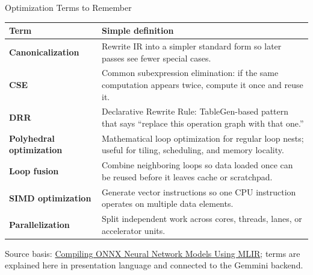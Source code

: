 \documentclass[aspectratio=169,10pt]{beamer}
\newcommand{\edgeword}[1]{\textcolor{red!75!black}{\textbf{#1}}}
\begin{document}
\begin{frame}{Optimization Terms to Remember}
  \scriptsize
  \begin{tabularx}{\textwidth}{@{}lX@{}}
    \toprule
    Term & Simple definition \\
    \midrule
    \edgeword{Canonicalization} & Rewrite IR into a simpler standard form so later passes see fewer special cases. \\
    \edgeword{CSE} & Common subexpression elimination: if the same computation appears twice, compute it once and reuse it. \\
    \edgeword{DRR} & Declarative Rewrite Rule: TableGen-based pattern that says ``replace this operation graph with that one.'' \\
    \edgeword{Polyhedral optimization} & Mathematical loop optimization for regular loop nests; useful for tiling, scheduling, and memory locality. \\
    \edgeword{Loop fusion} & Combine neighboring loops so data loaded once can be reused before it leaves cache or scratchpad. \\
    \edgeword{SIMD optimization} & Generate vector instructions so one CPU instruction operates on multiple data elements. \\
    \edgeword{Parallelization} & Split independent work across cores, threads, lanes, or accelerator units. \\
    \bottomrule
  \end{tabularx}

  \vspace{0.45em}
  {\tiny Source basis: \href{https://arxiv.org/abs/2008.08272}{Compiling ONNX Neural Network Models Using MLIR}; terms are explained here in presentation language and connected to the Gemmini backend.}
\end{frame}
\end{document}
